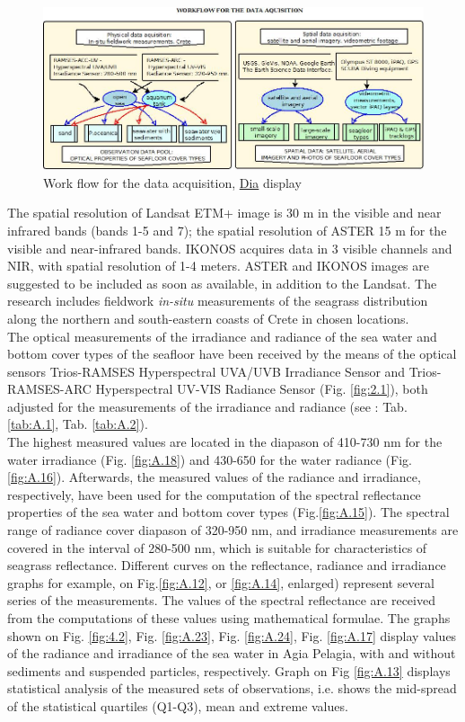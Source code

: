 \documentclass[11pt]{article}
\begin{document}
\begin{figure}[h]
	\centering
	\includegraphics[scale=0.40]{UML_Dia.jpg}
	\caption{Work flow for the data acquisition, \href{http://live.gnome.org/Dia}{Dia} display}
	\label{fig:24}
\end{figure}

The spatial resolution of \ac{Landsat ETM+} image is 30 m in the visible and near infrared bands (bands
1-5 and 7); the spatial resolution of \ac{ASTER} 15 m for the visible and near-infrared bands. IKONOS
acquires data in 3 visible channels and \ac{NIR}, with spatial resolution of 1-4 meters. \ac{ASTER} and
IKONOS images are suggested to be included as soon as available, in addition to the Landsat. The
research includes fieldwork \textit{in-situ} measurements of the seagrass distribution along the northern and
south-eastern coasts of Crete in chosen locations.\\
The optical measurements of the irradiance and radiance of the sea water and bottom cover types of
the seafloor have been received by the means of the optical sensors \ac{Trios-RAMSES} Hyperspectral
\ac{UVA}/\ac{UVB} Irradiance Sensor and \ac{Trios-RAMSES}-ARC Hyperspectral \ac{UV}-\ac{VIS} Radiance Sensor (Fig. \ref{fig:2.1}), both adjusted for the measurements of the irradiance and radiance (see : Tab. \ref{tab:A.1}, Tab. \ref{tab:A.2}). \\
The highest measured values are located in the diapason of 410-730 nm for the water irradiance (Fig. \ref{fig:A.18}) and 430-650 for the water radiance (Fig.\ref{fig:A.16}). 
Afterwards, the measured values of the radiance and irradiance, respectively, have been used for the computation of the spectral reflectance
properties of the sea water and bottom cover types (Fig.\ref{fig:A.15}). The spectral range of radiance
cover diapason of 320-950 nm, and irradiance measurements are covered in the interval of 280-500
nm, which is suitable for characteristics of seagrass reflectance.
Different curves on the reflectance, radiance and irradiance graphs for example, on Fig.\ref{fig:A.12}, or \ref{fig:A.14}, enlarged) represent several series of the measurements. The values of the spectral reflectance are received from the
computations of these values using mathematical formulae. The graphs shown on Fig. \ref{fig:4.2}, Fig. \ref{fig:A.23}, Fig. \ref{fig:A.24}, Fig. \ref{fig:A.17} display values of the radiance and irradiance of the sea water in Agia Pelagia, with and without sediments and suspended particles, respectively. Graph on Fig \ref{fig:A.13} displays statistical analysis of the measured sets of observations, i.e. shows the mid-spread of the statistical quartiles (Q1-Q3), mean and extreme values.
\end{document}
